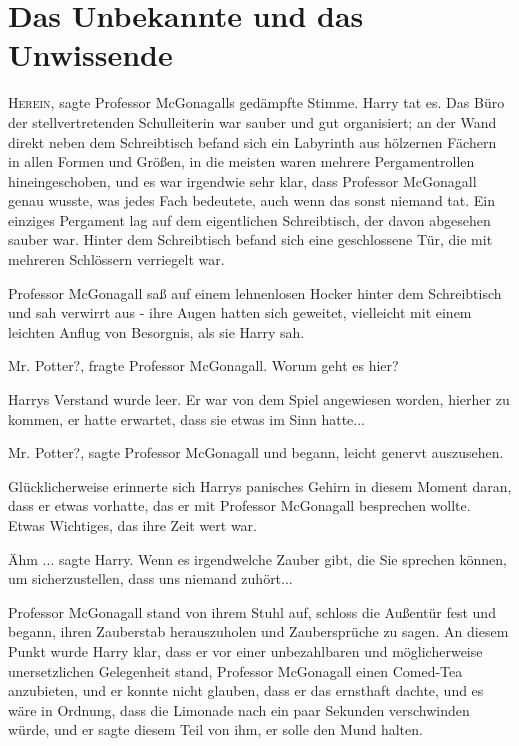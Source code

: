 \chapter{Das Unbekannte und das Unwissende}

\lettrine{\loq H}{erein}\grqq{}, sagte Professor McGonagalls gedämpfte Stimme.
Harry tat es. Das Büro der stellvertretenden Schulleiterin war sauber und gut
organisiert; an der Wand direkt neben dem Schreibtisch befand sich ein Labyrinth
aus hölzernen Fächern in allen Formen und Größen, in die meisten waren mehrere
Pergamentrollen hineingeschoben, und es war irgendwie sehr klar, dass Professor
McGonagall genau wusste, was jedes Fach bedeutete, auch wenn das sonst niemand
tat. Ein einziges Pergament lag auf dem eigentlichen Schreibtisch, der davon
abgesehen sauber war. Hinter dem Schreibtisch befand sich eine geschlossene Tür,
die mit mehreren Schlössern verriegelt war.

Professor McGonagall saß auf einem lehnenlosen Hocker hinter dem Schreibtisch
und sah verwirrt aus - ihre Augen hatten sich geweitet, vielleicht mit einem
leichten Anflug von Besorgnis, als sie Harry sah.

\glqq Mr. Potter?\grqq{}, fragte Professor McGonagall. \glqq Worum geht es
hier?\grqq{}

Harrys Verstand wurde leer. Er war von dem Spiel angewiesen worden, hierher zu
kommen, er hatte erwartet, dass sie etwas im Sinn hatte...

\glqq Mr. Potter?\grqq{}, sagte Professor McGonagall und begann, leicht genervt
auszusehen.

Glücklicherweise erinnerte sich Harrys panisches Gehirn in diesem Moment daran,
dass er etwas vorhatte, das er mit Professor McGonagall besprechen wollte. Etwas
Wichtiges, das ihre Zeit wert war.

\glqq Ähm ...\grqq{} sagte Harry. \glqq Wenn es irgendwelche Zauber gibt, die
Sie sprechen können, um sicherzustellen, dass uns niemand zuhört...\grqq{}

Professor McGonagall stand von ihrem Stuhl auf, schloss die Außentür fest und
begann, ihren Zauberstab herauszuholen und Zaubersprüche zu sagen. An diesem
Punkt wurde Harry klar, dass er vor einer unbezahlbaren und möglicherweise
unersetzlichen Gelegenheit stand, Professor McGonagall einen Comed-Tea
anzubieten, und er konnte nicht glauben, dass er das ernsthaft dachte, und es
wäre in Ordnung, dass die Limonade nach ein paar Sekunden verschwinden würde,
und er sagte diesem Teil von ihm, er solle den Mund halten.

